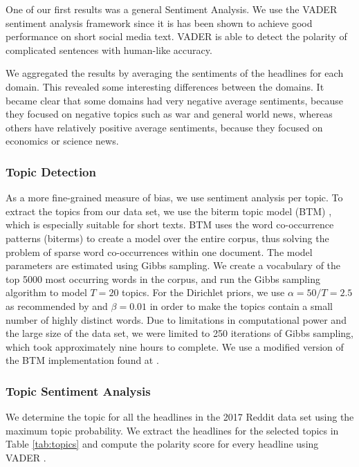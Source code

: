 \documentclass[final]{ieee}
\begin{document}
One of our first results was a general Sentiment Analysis. We use the VADER sentiment analysis framework \cite{VAD14} since it is has been shown to achieve good performance on short social media text. VADER is able to detect the polarity of complicated sentences with human-like accuracy.

We aggregated the results by averaging the sentiments of the headlines for each domain. This revealed some interesting differences between the domains. It became clear that some domains had very negative average sentiments, because they focused on negative topics such as war and general world news, whereas others have relatively positive average sentiments, because they focused on economics or science news.

\subsubsection{Topic Detection}\label{sec:topic detection}

As a more fine-grained measure of bias, we use sentiment analysis per topic. To extract the topics from our data set, we use the biterm topic model (BTM) \cite{BTM13}, which is especially suitable for short texts. BTM uses the word co-occurrence patterns (biterms) to create a model over the entire corpus, thus solving the problem of sparse word co-occurrences within one document. The model parameters are estimated using Gibbs sampling. We create a vocabulary of the top 5000 most occurring words in the corpus, and run the Gibbs sampling algorithm to model $T = 20$ topics. For the Dirichlet priors, we use $\alpha = 50/T = 2.5$ as recommended by \cite{FST13} and $\beta = 0.01$ in order to make the topics contain a small number of highly distinct words. Due to limitations in computational power and the large size of the data set, we were limited to 250 iterations of Gibbs sampling, which took approximately nine hours to complete. We use a modified version of the BTM implementation found at \cite{BTM15}.

\subsubsection{Topic Sentiment Analysis}\label{sec:topic sent}

We determine the topic for all the headlines in the 2017 Reddit data set using the maximum topic probability. We extract the headlines for the selected topics in Table \ref{tab:topics} and compute the polarity score for every headline using VADER \cite{VAD14}.
\end{document}
